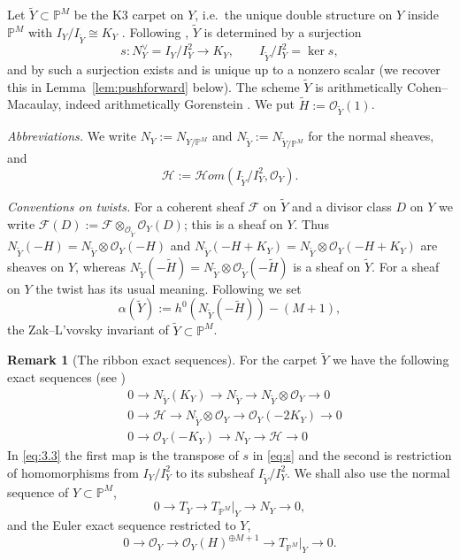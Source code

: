 \documentclass[11pt,reqno]{amsart}
\theoremstyle{plain}
\theoremstyle{definition}
\newtheorem{remark}[theorem]{Remark}
\newcommand{\PM}{\mathbb{P}^M}
\newcommand{\OO}{\mathcal{O}}
\newcommand{\sHom}{\mathcal{H}om}
\newcommand{\Yt}{\widetilde{Y}}
\newcommand{\Ht}{\widetilde{H}}
\newcommand{\NY}{N_{Y}}
\newcommand{\NYt}{N_{\Yt}}
\newcommand{\Hc}{\mathcal{H}}
\newcommand{\TP}{T_{\PM}|_Y}
\newcommand{\Dd}{D}
\begin{document}
Let $\Yt\subset\PM$ be the K3 carpet on $Y$, i.e.\ the unique double structure on $Y$ inside $\PM$ with $I_Y/I_{\Yt}\cong K_Y$ \cite[Proposition~1.7]{GP97}. Following \cite{BE95}, $\Yt$ is determined by a surjection
\begin{equation}\label{eq:s}
s\colon \NY^{\vee}=I_Y/I_Y^2\longrightarrow K_Y ,\qquad I_{\Yt}/I_Y^2=\ker s ,
\end{equation}
and by \cite[Proposition~1.7]{GP97} such a surjection exists and is unique up to a nonzero scalar (we recover this in Lemma~\ref{lem:pushforward} below). The scheme $\Yt$ is arithmetically Cohen--Macaulay, indeed arithmetically Gorenstein \cite[Theorem~3.2]{ES18}. We put $\Ht:=\OO_{\Yt}(1)$.

\emph{Abbreviations.} We write $\NY:=N_{Y/\PM}$ and $\NYt:=N_{\Yt/\PM}$ for the normal sheaves, and
\[
\Hc:=\sHom(I_{\Yt}/I_Y^2,\OO_Y).
\]

\emph{Conventions on twists.} For a coherent sheaf $\mathcal{F}$ on $\Yt$ and a divisor class $\Dd$ on $Y$ we write $\mathcal{F}(\Dd):=\mathcal{F}\otimes_{\OO_{\Yt}}\OO_Y(\Dd)$; this is a sheaf on $Y$. Thus $\NYt(-H)=\NYt\otimes\OO_Y(-H)$ and $\NYt(-H+K_Y)=\NYt\otimes\OO_Y(-H+K_Y)$ are sheaves on $Y$, whereas $\NYt(-\Ht)=\NYt\otimes\OO_{\Yt}(-\Ht)$ is a sheaf on $\Yt$. For a sheaf on $Y$ the twist has its usual meaning. Following \cite{BM24} we set
\[
\alpha(\Yt):=h^0(\NYt(-\Ht))-(M+1),
\]
the Zak--L'vovsky invariant of $\Yt\subset\PM$.

\begin{remark}[The ribbon exact sequences]\label{rem:sequences}
For the carpet $\Yt$ we have the following exact sequences (see \cite[Lemma~4.1]{GGP08})
\begin{align}
&0\to \NYt(K_Y)\to \NYt\to \NYt\otimes\OO_Y\to 0 \label{eq:3.1}\\
&0\to \Hc\to \NYt\otimes\OO_Y\to \OO_Y(-2K_Y)\to 0 \label{eq:3.2}\\
&0\to \OO_Y(-K_Y)\to \NY\to \Hc\to 0 \label{eq:3.3}
\end{align}
In \eqref{eq:3.3} the first map is the transpose of $s$ in \eqref{eq:s} and the second is restriction of homomorphisms from $I_Y/I_Y^2$ to its subsheaf $I_{\Yt}/I_Y^2$. We shall also use the normal sequence of $Y\subset\PM$,
\begin{equation}\label{eq:3.10}
0\to T_Y\to \TP\to \NY\to 0,
\end{equation}
and the Euler exact sequence restricted to $Y$,
\begin{equation}\label{eq:3.11}
0\to \OO_Y\to \OO_Y(H)^{\oplus M+1}\to \TP\to 0 .
\end{equation}
\end{remark}
\end{document}
